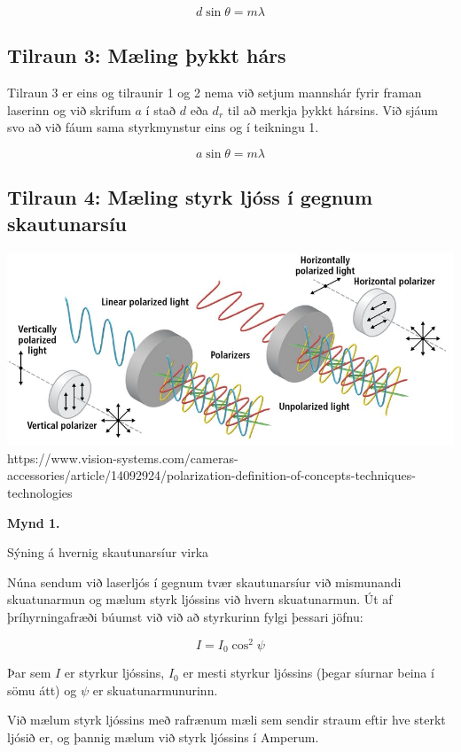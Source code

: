 \documentclass[12pt]{article}
\begin{document}
\[d \sin{\theta} = m\lambda\]

\subsection{Tilraun 3: Mæling þykkt hárs}

Tilraun 3 er eins og tilraunir 1 og 2 nema við setjum mannshár fyrir framan laserinn og við skrifum $a$ í stað $d$ eða $d_r$ til að merkja þykkt hársins. Við sjáum svo að við fáum sama styrkmynstur eins og í teikningu 1.

\[a \sin{\theta} = m\lambda\]

\subsection{Tilraun 4: Mæling styrk ljóss í gegnum skautunarsíu}

\begin{center}
    \includegraphics[scale=0.4]{html/polMynd.jpg}
    {\scriptsize https://www.vision-systems.com/cameras-accessories/article/14092924/polarization-definition-of-concepts-techniques-technologies}
    
    \bf Mynd 1.

    {\footnotesize Sýning á hvernig skautunarsíur virka}
\end{center}

Núna sendum við laserljós í gegnum tvær skautunarsíur við mismunandi skuatunarmun og mælum styrk ljóssins við hvern skuatunarmun. Út af þríhyrningafræði búumst við við að styrkurinn fylgi þessari jöfnu:

\[ I = I_0 \cos^2{\psi} \]

Þar sem $I$ er styrkur ljóssins, $I_0$ er mesti styrkur ljóssins (þegar síurnar beina í sömu átt) og $\psi$ er skuatunarmunurinn.

Við mælum styrk ljóssins með rafrænum mæli sem sendir straum eftir hve sterkt ljósið er, og þannig mælum við styrk ljóssins í Amperum.
\end{document}

